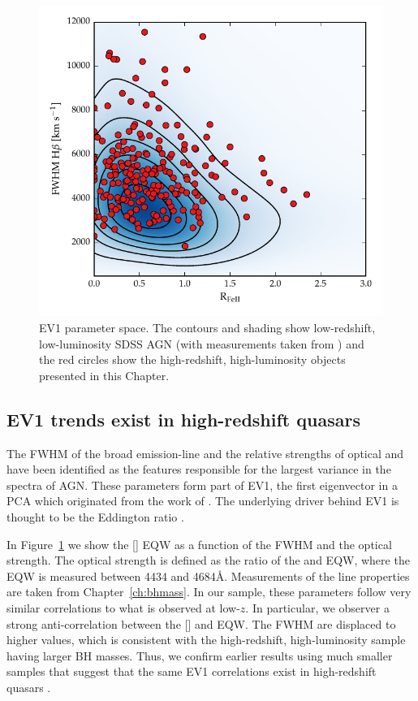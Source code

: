\begin{figure}[t!]
    \includegraphics[width=\columnwidth]{figures/chapter04/ev1_lowz.pdf} 
    \caption[{EV1 parameter space.}]{EV1 parameter space. The contours and shading show low-redshift, low-luminosity SDSS AGN (with measurements taken from \citet{shen11}) and the red circles show the high-redshift, high-luminosity objects presented in this Chapter.}      
    \label{fig:ev1_lowz}
\end{figure}

\subsection{EV1 trends exist in high-redshift quasars}

The FWHM of the broad \hb emission-line and the relative strengths of optical  and \hb have been identified as the features responsible for the largest variance in the spectra of AGN. 
These parameters form part of EV1, the first eigenvector in a PCA which originated from the work of \citet{boroson92}.   
The underlying driver behind EV1 is thought to be the Eddington ratio \citep[e.g.][]{sulentic00b,shen14}.

In Figure~\ref{fig:ev1_lowz} we show the [] EQW as a function of the \hb FWHM and the optical  strength. 
The optical  strength is defined as the ratio of the  and \hb EQW, where the  EQW is measured between 4434 and 4684\AA.
Measurements of the \hb line properties are taken from Chapter~\ref{ch:bhmass}. 
In our sample, these parameters follow very similar correlations to what is observed at low-$z$.
In particular, we observer a strong anti-correlation between the [] and  EQW.  
The \hb FWHM are displaced to higher values, which is consistent with the high-redshift, high-luminosity sample having larger BH masses. 
Thus, we confirm earlier results using much smaller samples that suggest that the same EV1 correlations exist in high-redshift quasars \citep[e.g.][]{netzer04,sulentic04,sulentic06,runnoe13,shen16a}.


